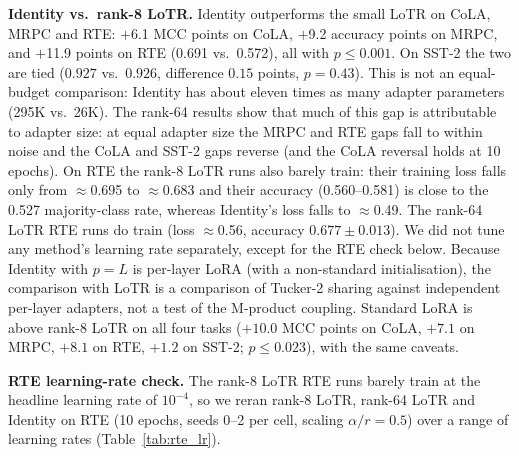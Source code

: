 \documentclass{article}
\theoremstyle{plain}
\begin{document}
\textbf{Identity vs.\ rank-8 LoTR.}
Identity outperforms the small LoTR on CoLA, MRPC and RTE:
$+$6.1 MCC points on CoLA, $+$9.2 accuracy points on MRPC,
and $+$11.9 points on RTE (0.691 vs.\ 0.572), all with $p\le0.001$.
On SST-2 the two are tied ($0.927$ vs.\ $0.926$, difference $0.15$ points, $p=0.43$).
This is not an equal-budget comparison: Identity has about eleven times as many adapter parameters (295K vs.\ 26K).
The rank-64 results show that much of this gap is attributable to adapter size: at equal adapter size the MRPC and RTE gaps
fall to within noise and the CoLA and SST-2 gaps reverse (and the CoLA reversal holds at 10 epochs).
On RTE the rank-8 LoTR runs also barely train: their training loss falls only from $\approx$0.695 to $\approx$0.683
and their accuracy (0.560--0.581) is close to the 0.527 majority-class rate, whereas Identity's loss falls to $\approx$0.49.
The rank-64 LoTR RTE runs do train (loss $\approx$0.56, accuracy $0.677\pm0.013$).
We did not tune any method's learning rate separately, except for the RTE check below.
Because Identity with $p=L$ is per-layer LoRA (with a non-standard initialisation), the comparison with LoTR is a comparison of Tucker-2 sharing against
independent per-layer adapters, not a test of the M-product coupling.
Standard LoRA is above rank-8 LoTR on all four tasks ($+10.0$ MCC points on CoLA, $+7.1$ on MRPC, $+8.1$ on RTE, $+1.2$ on SST-2; $p\le0.023$), with the same caveats.

\textbf{RTE learning-rate check.}
The rank-8 LoTR RTE runs barely train at the headline learning rate of $10^{-4}$, so we reran rank-8 LoTR, rank-64 LoTR and Identity
on RTE (10 epochs, seeds 0--2 per cell, scaling $\alpha/r=0.5$) over a range of learning rates (Table~\ref{tab:rte_lr}).
\end{document}
